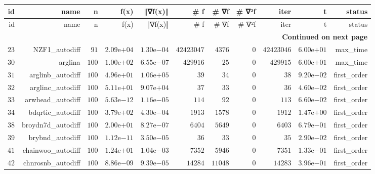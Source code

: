 \documentclass[varwidth=20cm,crop=true]{standalone}
\begin{document}
\begin{longtable}{rrrrrrrrrrr}
  \hline
  id & name & n & f(x) & ‖∇f(x)‖ & # f & # ∇f & # ∇²f & iter & t & status \\\hline
  \endfirsthead
  \hline
  id & name & n & f(x) & ‖∇f(x)‖ & # f & # ∇f & # ∇²f & iter & t & status \\\hline
  \endhead
  \hline
  \multicolumn{11}{r}{{\bfseries Continued on next page}}\\
  \hline
  \endfoot
  \endlastfoot
  \(    23\) & NZF1\_autodiff & \(    91\) & \( 2.09\)e\(+04\) & \( 1.30\)e\(-04\) & \(42423047\) & \(  4376\) & \(     0\) & \(42423046\) & \( 6.00\)e\(+01\) & max\_time \\
  \(    30\) & arglina & \(   100\) & \( 1.00\)e\(+02\) & \( 6.55\)e\(-07\) & \(429916\) & \(    25\) & \(     0\) & \(429915\) & \( 6.00\)e\(+01\) & max\_time \\
  \(    31\) & arglinb\_autodiff & \(   100\) & \( 4.96\)e\(+01\) & \( 1.06\)e\(+05\) & \(    39\) & \(    34\) & \(     0\) & \(    38\) & \( 9.20\)e\(-02\) & first\_order \\
  \(    32\) & arglinc\_autodiff & \(   100\) & \( 5.11\)e\(+01\) & \( 9.07\)e\(+04\) & \(    37\) & \(    33\) & \(     0\) & \(    36\) & \( 4.60\)e\(-02\) & first\_order \\
  \(    33\) & arwhead\_autodiff & \(   100\) & \( 5.63\)e\(-12\) & \( 1.16\)e\(-05\) & \(   114\) & \(    92\) & \(     0\) & \(   113\) & \( 6.60\)e\(-02\) & first\_order \\
  \(    34\) & bdqrtic\_autodiff & \(   100\) & \( 3.79\)e\(+02\) & \( 4.30\)e\(-04\) & \(  1913\) & \(  1578\) & \(     0\) & \(  1912\) & \( 1.47\)e\(+00\) & first\_order \\
  \(    38\) & broydn7d\_autodiff & \(   100\) & \( 2.00\)e\(+01\) & \( 8.27\)e\(-07\) & \(  6404\) & \(  5649\) & \(     0\) & \(  6403\) & \( 6.79\)e\(-01\) & first\_order \\
  \(    39\) & brybnd\_autodiff & \(   100\) & \( 1.12\)e\(-11\) & \( 3.50\)e\(-05\) & \(    36\) & \(    33\) & \(     0\) & \(    35\) & \( 2.90\)e\(-02\) & first\_order \\
  \(    41\) & chainwoo\_autodiff & \(   100\) & \( 1.24\)e\(+01\) & \( 1.04\)e\(-03\) & \(  7352\) & \(  5946\) & \(     0\) & \(  7351\) & \( 1.33\)e\(-01\) & first\_order \\
  \(    42\) & chnrosnb\_autodiff & \(   100\) & \( 8.86\)e\(-09\) & \( 9.39\)e\(-05\) & \( 14284\) & \( 11048\) & \(     0\) & \( 14283\) & \( 3.96\)e\(-01\) & first\_order \\

\end{longtable}
\end{document}

